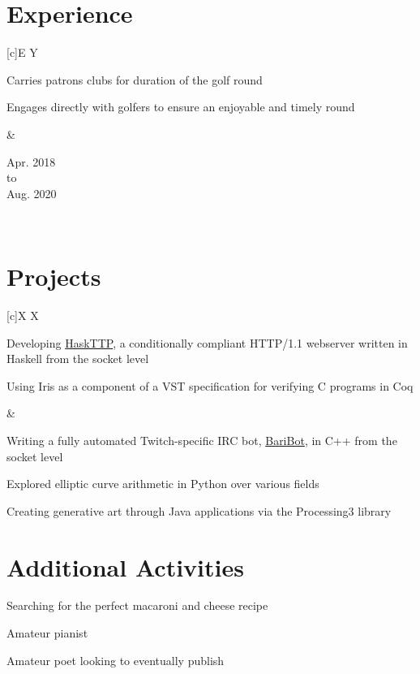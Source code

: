 \documentclass[10.5pt, letterpaper]{article}
\newenvironment{Experience} %
{                           %
	\section*{Experience}   %
	\flushleft              %
}{                          %
	\endflushleft           %
}
\newenvironment{Activities}          %
{                                    %
	\section*{Additional Activities} %
	\begin{center}                   %
		\begin{multicols}{2}         %
			\begin{description}      %
}{                                   %
			\end{description}        %
		\end{multicols}              %
	\end{center}                     %
}
\newenvironment{Projects}         %
{                                 %
	\section*{Projects}           %
	\flushleft                    %
	\tabularx{\textwidth}[c]{X X} %
}{                                %
	\endtabularx                  %
	\endflushleft                 %
}
\newenvironment{TitleDescription}[1]                    %
{                                                       %
	\begin{description}                                 %
		\item [#1]                                      %
		\let\realitem\item                              %
		\renewcommand{\item}[1]{\let\item\realitem ##1} %
}{                                                      %
	\end{description}                                   %
}
\newenvironment{ExpEntry}[3]               %
{                                          %
	\newcommand{\DateLine}{#2 \\ to \\ #3} %
	\tabularx{\textwidth}[c]{E Y}          %
		\begin{TitleDescription}{#1}       %
}{                                         %
		\end{TitleDescription}             %
	&                                      %
	\begin{center} \DateLine \end{center}  %
	\\                                     %
	\endtabularx                           %
}
\begin{document}
\begin{Experience}
	\begin{ExpEntry}{Golf Caddie, Naperville Country Club}
		{Apr. 2018}{Aug. 2020}
		\item Carries patrons clubs for duration of the golf round
		\item Engages directly with golfers to ensure an enjoyable and timely round
	\end{ExpEntry} 
\end{Experience}

\begin{Projects}
	\begin{TitleDescription}{Current Projects}
		\item Developing \href{https://github.com/Baricus/HaskTTP}{HaskTTP}, a conditionally compliant HTTP/1.1 webserver written in Haskell from the socket level
		\item Using Iris as a component of a VST specification for verifying C programs in Coq
	\end{TitleDescription}

	&
	\begin{TitleDescription}{Prior Projects}
		\item Writing a fully automated Twitch-specific IRC bot, \href{https://github.com/Baricus/BariBot}{BariBot}, in C++ from the socket level
		\item Explored elliptic curve arithmetic in Python over various fields
		\item Creating generative art through Java applications via the Processing3 library

	\end{TitleDescription}	
\end{Projects}

\begin{Activities}
			\item Searching for the perfect macaroni and cheese recipe
			\item Amateur pianist
			\item Amateur poet looking to eventually publish
\end{Activities}
\end{document}
